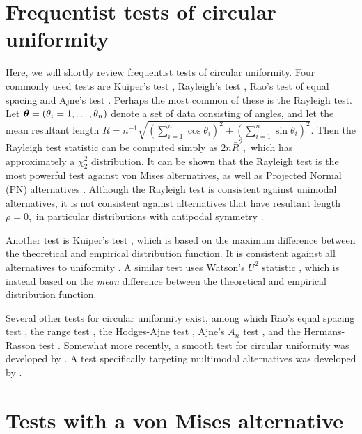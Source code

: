 \section{Frequentist tests of circular uniformity} \label{sec:freq}

Here, we will shortly review frequentist tests of circular uniformity. Four commonly used tests are Kuiper's test \citep{kuiper1960tests}, Rayleigh's test \citep{mardia2009directional, brazier1994confidence}, Rao's test of equal spacing \citep{rao1976some} and Ajne's test \citep{ajne1968simple}. Perhaps the most common of these is the Rayleigh test. Let \( \boldsymbol{\theta} = (\theta_i = 1, \dots, \theta_n) \) denote a set of data consisting of angles, and let the mean resultant length \( \bar{R} = n^{-1} \sqrt{ (\sum_{i=1}^n \cos \theta_i)^2 + (\sum_{i=1}^n \sin \theta_i)^2} \). Then the Rayleigh test statistic can be computed simply as \( 2 n \bar{R}^2,\) which has approximately a \( \chi^2_2 \) distribution. It can be shown that the Rayleigh test is the most powerful test against von Mises alternatives, as well as Projected Normal (PN) alternatives \citep{bhattacharyya1969hodges}. Although the Rayleigh test is consistent against unimodal alternatives, it is not consistent against alternatives that have resultant length \( \rho = 0,\) in particular distributions with antipodal symmetry \citep{mardia2009directional}.

Another test is Kuiper's test \citep{kuiper1960tests}, which is based on the maximum difference between the theoretical and empirical distribution function. It is consistent against all alternatives to uniformity \citep{mardia2009directional}. 
A similar test uses Watson's \( U^2 \) statistic \citep{watson1961goodness}, which is instead based on the \textit{mean} difference between the theoretical and empirical distribution function. 

Several other tests for circular uniformity exist, among which Rao's equal spacing test \citep{rao1976some}, the range test \citep{laubscher1968distribution}, the Hodges-Ajne test \citep{hodges1955bivariate, ajne1968simple}, Ajne's \(A_n\) test \citep{ajne1968simple}, and the Hermans-Rasson test \citep{hermans1985new}. Somewhat more recently, a smooth test for circular uniformity was developed by \citet{bogdan2002data}. A test specifically targeting multimodal alternatives was developed by \citet{pycke2010some}.



\section{Tests with a von Mises alternative} \label{isotestvm}

